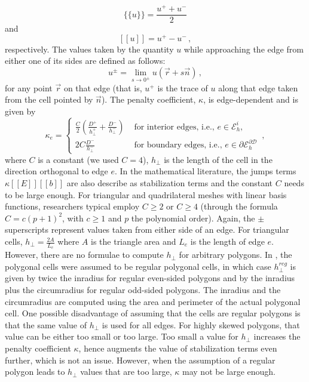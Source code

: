 \documentclass[preprint,10pt]{elsarticle}
\newcommand{\jmp}[1]{[\![#1]\!]}                     %
\newcommand{\mvl}[1]{\{\!\!\{#1\}\!\!\}}             %
\newcommand{\D}{\mathcal{D}}
\newcommand{\vr}{\vec{r}}
\newcommand{\vn}{\vec{n}}
\newcommand{\EI}{\mathcal{E}_h^i}
\newcommand{\reg}{\textit{reg}}
\newcommand{\tf}{b}
\begin{document}
\begin{equation} \label{eq:mean}
\mvl{u} = \frac{u^+ + u^-}{2}
\end{equation}
and
\begin{equation} \label{eq:jump}
\jmp{u} = u^+ - u^- \, ,
\end{equation}
respectively.  The values taken by the quantity $u$ while approaching the edge from either one of its sides are defined as follows:
\begin{equation} \label{eq:upm}
u^\pm = \lim_{s\to 0^\pm} u(\vr + s \vn) \, ,
\end{equation}
for any point $\vr$ on that edge (that is, $u^+$ is the trace of $u$ along that edge taken from the cell pointed by $\vn$).
%
The penalty coefficient, $\kappa$, is edge-dependent and is given by
\begin{equation}
  \kappa_e = \left\{
    \begin{array}{ll}
      \frac{C}{2} \left( \frac{D^+}{h_\bot^+} + \frac{D^-}{h_\bot^-} \right) & \textrm{ for interior edges, i.e., } e \in \EI,\\
      2C \frac{D^-}{h_\bot^-}  & \textrm{ for boundary edges, i.e., } e \in \partial \mathcal{E}_h^{\partial\D}
    \end{array}
    \right. \, ,
\end{equation}
where $C$ is a constant (we used $C=4$), $h_{\bot}$ is the length of the cell in the direction 
orthogonal to edge $e$. In the mathematical literature, the jumps terms $\kappa\jmp{E}\jmp{\tf}$
are also describe as stabilization terms and the constant $C$ needs to be large enough. 
For triangular and quadrilateral meshes with linear basis functions, researchers typical employ 
$C \ge 2$ or $C \ge 4$ (through the formula $C=c(p+1)^2$, with $c\ge 1$ and $p$ the polynomial order).
Again, the $\pm$ superscripts represent values taken from either 
side of an edge. For triangular cells, $h_{\bot}=\frac{2A}{L_e}$ where $A$
is the triangle area and $L_e$ is the length of edge $e$. 
However, there are no formulae to compute $h_{\bot}$ for arbitrary polygons. In \cite{BT-PhD}, 
the polygonal cells were assumed to be regular polygonal cells, in which case $h_{\bot}^\reg$ is given
by twice the inradius for regular even-sided polygons and by the inradius plus the 
circumradius for regular odd-sided polygons. The inradius and the circumradius are computed 
using the area and perimeter of the actual polygonal cell. One possible disadvantage of assuming 
that the cells are regular polygons is that the same value of $h_{\bot}$ is used for all edges.
For highly skewed polygons, that value can be either too small or too large. Too small a value for 
$h_{\bot}$ increases the penalty coefficient $\kappa$, hence augments the value of stabilization 
terms even further, which is not an issue. However, when the assumption of a regular polygon leads to
$h_{\bot}$ values that are too large, $\kappa$ may not be large enough.
\end{document}
